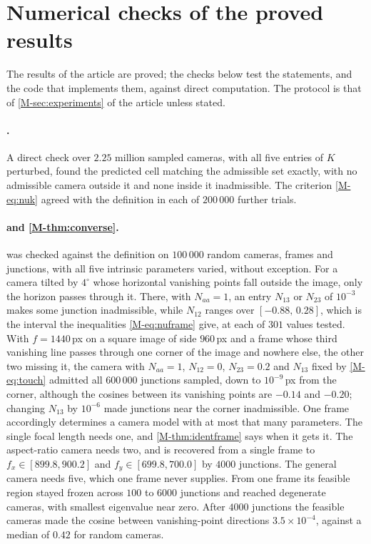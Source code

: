 \section{Numerical checks of the proved results}\label{sec:Schecks}

The results of the article are proved; the checks below test the statements, and the code that implements them, against direct computation. The protocol is that of \cref{M-sec:experiments} of the article unless stated.

\paragraph{.} A direct check over $2.25$ million sampled cameras, with all five entries of $K$ perturbed, found the predicted cell matching the admissible set exactly, with no admissible camera outside it and none inside it inadmissible. The criterion \eqref{M-eq:nuk} agreed with the definition in each of $200\,000$ further trials.

\paragraph{ and \cref{M-thm:converse}.}  was checked against the definition on $100\,000$ random cameras, frames and junctions, with all five intrinsic parameters varied, without exception. For a camera tilted by $4^\circ$ whose horizontal vanishing points fall outside the image, only the horizon passes through it. There, with $N_{aa}=1$, an entry $N_{13}$ or $N_{23}$ of $10^{-3}$ makes some junction inadmissible, while $N_{12}$ ranges over $[-0.88,\,0.28]$, which is the interval the inequalities \eqref{M-eq:nuframe} give, at each of $301$ values tested. With $f=1440$\,px on a square image of side $960$\,px and a frame whose third vanishing line passes through one corner of the image and nowhere else, the other two missing it, the camera with $N_{aa}=1$, $N_{12}=0$, $N_{23}=0.2$ and $N_{13}$ fixed by \eqref{M-eq:touch} admitted all $600\,000$ junctions sampled, down to $10^{-9}$\,px from the corner, although the cosines between its vanishing points are $-0.14$ and $-0.20$; changing $N_{13}$ by $10^{-6}$ made junctions near the corner inadmissible. One frame accordingly determines a camera model with at most that many parameters. The single focal length needs one, and \cref{M-thm:identframe} says when it gets it. The aspect-ratio camera needs two, and is recovered from a single frame to $f_x\in[899.8,900.2]$ and $f_y\in[699.8,700.0]$ by $4000$ junctions. The general camera needs five, which one frame never supplies. From one frame its feasible region stayed frozen across $100$ to $6000$ junctions and reached degenerate cameras, with smallest eigenvalue near zero. After $4000$ junctions the feasible cameras made the cosine between vanishing-point directions $3.5\times10^{-4}$, against a median of $0.42$ for random cameras.

